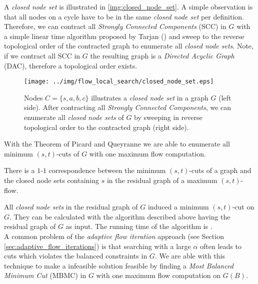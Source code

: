 A \emph{closed node set} is illustrated in \autoref{img:closed_node_set}. A simple observation
is that all nodes on a cycle have to be in the same \emph{closed node set} per definition. Therefore,
we can contract all \emph{Strongly Connected Components} (SCC) in $G$ with a simple linear time algorithm
proposed by Tarjan () and sweep to the reverse
topological order of the contracted graph to enumerate all \emph{closed node sets}. Note, if
we contract all SCC in $G$ the resulting graph is a \emph{Directed Acyclic Graph} (DAC), therefore 
a topological order exists.
\begin{figure}
\centering
\texttt{[image: ../img/flow\_local\_search/closed\_node\_set.eps]}
\caption{Nodes $C = \{s,a,b,c\}$ illustrates a \emph{closed node set} in a graph $G$ (left side).
         After contracting all \emph{Strongly Connected Components}, we can enumerate all
         \emph{closed node sets} of $G$ by sweeping in reverse topological order to the
         contracted graph (right side).}
\label{img:closed_node_set}
\end{figure}

With the Theorem of Picard and Queyranne \cite{picard1980structure} we are able to enumerate
all minimum $(s,t)$-cuts of $G$ with one maximum flow computation.

\begin{theorem}
\label{theorem:mbmc}
There is a $1$-$1$ correspondence between the minimum $(s,t)$-cuts of a graph and the closed node
sets containing $s$ in the residual graph of a maximum $(s,t)$-flow.
\end{theorem}

All \emph{closed node sets} in the residual graph of $G$ induced a minimum $(s,t)$-cut on $G$.
They can be calculated with the algorithm described above having the residual graph of
$G$ as input. The running time of the algorithm is . \\
A common problem of the \emph{adaptive flow iteration} approach (see Section \ref{sec:adaptive_flow_iterations}) is
that searching with a large $\alpha$ often leads to cuts which violates the balanced constraints
in $G$. We are able with this technique to make a infeasible solution feasible by finding
a \emph{Most Balanced Minimum Cut} (MBMC) in $G$ with one maximum flow computation on $G(B)$.



